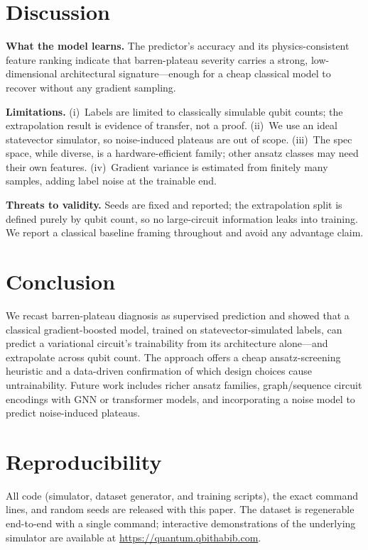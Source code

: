 \documentclass[journal]{IEEEtran}
\begin{document}
\section{Discussion}
\textbf{What the model learns.} The predictor's accuracy and its
physics-consistent feature ranking indicate that barren-plateau severity carries
a strong, low-dimensional architectural signature---enough for a cheap classical
model to recover without any gradient sampling.

\textbf{Limitations.} (i)~Labels are limited to classically simulable qubit
counts; the extrapolation result is evidence of transfer, not a proof.
(ii)~We use an ideal statevector simulator, so noise-induced plateaus
\cite{wang2021noise} are out of scope. (iii)~The spec space, while diverse, is a
hardware-efficient family; other ansatz classes may need their own features.
(iv)~Gradient variance is estimated from finitely many samples, adding label
noise at the trainable end.

\textbf{Threats to validity.} Seeds are fixed and reported; the extrapolation
split is defined purely by qubit count, so no large-circuit information leaks into
training. We report a classical baseline framing throughout and avoid any
advantage claim.

\section{Conclusion}
We recast barren-plateau diagnosis as supervised prediction and showed that a
classical gradient-boosted model, trained on statevector-simulated labels, can
predict a variational circuit's trainability from its architecture alone---and
extrapolate across qubit count. The approach offers a cheap ansatz-screening
heuristic and a data-driven confirmation of which design choices cause
untrainability. Future work includes richer ansatz families, graph/sequence
circuit encodings with GNN or transformer models, and incorporating a noise model
to predict noise-induced plateaus.

\section*{Reproducibility}
All code (simulator, dataset generator, and training scripts), the exact command
lines, and random seeds are released with this paper. The dataset is regenerable
end-to-end with a single command; interactive demonstrations of the underlying
simulator are available at \url{https://quantum.qbithabib.com}.



\end{document}
